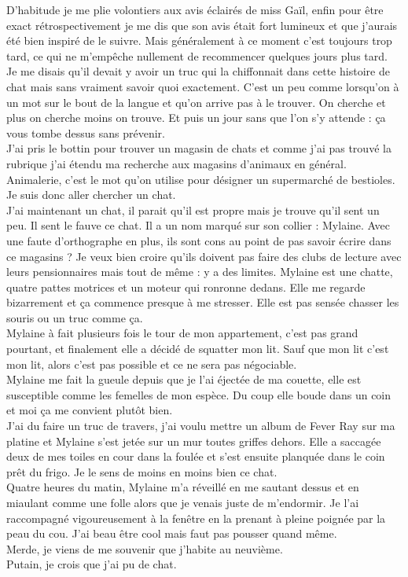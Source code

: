 D'habitude je me plie volontiers aux avis éclairés de miss Gaïl, enfin pour être exact rétrospectivement je me dis que son avis était fort lumineux et que j'aurais été bien inspiré de le suivre. Mais généralement à ce moment c'est toujours trop tard, ce qui ne m’empêche nullement de recommencer quelques jours plus tard. \\
Je me disais qu'il devait y avoir un truc qui la chiffonnait dans cette histoire de chat mais sans vraiment savoir quoi exactement. C'est un peu comme lorsqu'on à un mot sur le bout de la langue et qu'on arrive pas à le trouver. On cherche et plus on cherche moins on trouve. Et puis un jour sans que l'on s'y attende : ça vous tombe dessus sans prévenir.\\
J'ai pris le bottin pour trouver un magasin de chats et comme j'ai pas trouvé la rubrique j'ai étendu ma recherche aux magasins d'animaux en général. Animalerie, c'est le mot qu'on utilise pour désigner un supermarché de bestioles. Je suis donc aller chercher un chat. \\

J'ai maintenant un chat, il parait qu'il est propre mais je trouve qu'il sent un peu. Il sent le fauve ce chat. Il a un nom marqué sur son collier : Mylaine. Avec une faute d'orthographe en plus, ils sont cons au point de pas savoir écrire dans ce magasins ? Je veux bien croire qu'ils doivent pas faire des clubs de lecture avec leurs pensionnaires mais tout de même : y a des limites. Mylaine est une chatte, quatre pattes motrices et un moteur qui ronronne dedans. Elle me regarde bizarrement et ça commence presque à me stresser. Elle est pas sensée chasser les souris ou un truc comme ça. \\

Mylaine à fait plusieurs fois le tour de mon appartement, c'est pas grand pourtant, et finalement elle a décidé de squatter mon lit. Sauf que mon lit c'est mon lit, alors c'est pas possible et ce ne sera pas négociable. \\

Mylaine me fait la gueule depuis que je l'ai éjectée de ma couette, elle est susceptible comme les femelles de mon espèce. Du coup elle boude dans un coin et moi ça me convient plutôt bien. \\

J'ai du faire un truc de travers, j'ai voulu mettre un album de Fever Ray sur ma platine et Mylaine s'est jetée sur un mur toutes griffes dehors. Elle a saccagée deux de mes toiles en cour dans la foulée et s'est ensuite planquée dans le coin prêt du frigo. Je le sens de moins en moins bien ce chat. \\

Quatre heures du matin, Mylaine m'a réveillé en me sautant dessus et en miaulant comme une folle alors que je venais juste de m'endormir. Je l'ai raccompagné vigoureusement à la fenêtre en la prenant à pleine poignée par la peau du cou. J'ai beau être cool mais faut pas pousser quand même. \\

Merde, je viens de me souvenir que j'habite au neuvième.  \\

Putain, je crois que j'ai pu de chat.